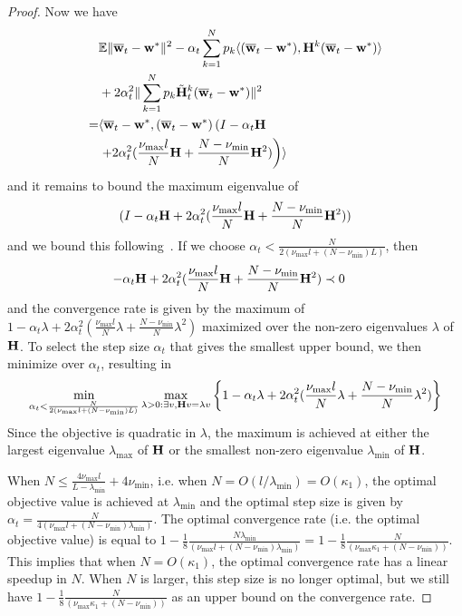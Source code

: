 \begin{proof}
	Now we have 
	\begin{align*}
	& \mathbb{E}\|{\overline{\mathbf{w}}}_{t}-{\mathbf{w}}^{\ast}\|^{2}-\alpha_{t}\sum_{k=1}^{N}p_{k}\langle({\overline{\mathbf{w}}}_{t}-{\mathbf{w}}^{\ast}),{\mathbf{H}}^{k}({\overline{\mathbf{w}}}_{t}-{\mathbf{w}}^{\ast})\rangle\\
	&+2\alpha_{t}^{2}\|\sum_{k=1}^{N}p_{k}\tilde{{\mathbf{H}}}_{t}^{k}({\overline{\mathbf{w}}}_{t}-{\mathbf{w}}^{\ast})\|^{2} \\
	= &\langle{\overline{\mathbf{w}}}_{t}-{\mathbf{w}}^{\ast},({\overline{\mathbf{w}}}_{t}-{\mathbf{w}}^{\ast})\left(I-\alpha_{t}{\mathbf{H}}\right.\\
	&\left.+2\alpha_{t}^{2}(\frac{\nu_{\max}l}{N}{\mathbf{H}}+\frac{N-\nu_{\min}}{N}{\mathbf{H}}^{2})\right)\rangle
	\end{align*}
	and it remains to bound the maximum eigenvalue of 
	\begin{align*}
	(I-\alpha_{t}{\mathbf{H}}+2\alpha_{t}^{2}(\frac{\nu_{\max}l}{N}{\mathbf{H}}+\frac{N-\nu_{\min}}{N}{\mathbf{H}}^{2}))
	\end{align*}
	and we bound this following~\cite{ma2017power}. If we choose $\alpha_{t}<\frac{N}{2(\nu_{\max}l+(N-\nu_{\min})L)}$,
	then 
	\begin{align*}
	-\alpha_{t}{\mathbf{H}}+2\alpha_{t}^{2}(\frac{\nu_{\max}l}{N}{\mathbf{H}}+\frac{N-\nu_{\min}}{N}{\mathbf{H}}^{2}) & \prec0
	\end{align*}
	and the convergence rate is given by the maximum of $1-\alpha_{t}\lambda+2\alpha_{t}^{2}(\frac{\nu_{\max}l}{N}\lambda+\frac{N-\nu_{\min}}{N}\lambda^{2})$
	maximized over the non-zero eigenvalues $\lambda$ of ${\mathbf{H}}$. To select
	the step size $\alpha_{t}$ that gives the smallest upper bound, we
	then minimize over $\alpha_{t}$, resulting in 
	{\tiny
	\begin{align*}
	\min_{\alpha_{t}<\frac{N}{2(\nu_{\max}l+(N-\nu_{\min})L)}}\max_{\lambda>0:\exists v,{\mathbf{H}} v=\lambda v}\left\{ 1-\alpha_{t}\lambda+2\alpha_{t}^{2}(\frac{\nu_{\max}l}{N}\lambda+\frac{N-\nu_{\min}}{N}\lambda^{2})\right\} 
	\end{align*}}%
	Since the objective is quadratic in $\lambda$, the maximum is achieved
	at either the largest eigenvalue $\lambda_{\max}$ of ${\mathbf{H}}$ or the
	smallest non-zero eigenvalue $\lambda_{\min}$ of ${\mathbf{H}}$. 
	
	When $N\leq\frac{4\nu_{\max}l}{L-\lambda_{\min}}+4\nu_{\min}$, i.e.
	when $N=O(l/\lambda_{\min})=O(\kappa_{1})$, the optimal objective
	value is achieved at $\lambda_{\min}$ and the optimal step size is
	given by $\alpha_{t}=\frac{N}{4(\nu_{\max}l+(N-\nu_{\min})\lambda_{\min})}$.
	The optimal convergence rate (i.e. the optimal objective value) is
	equal to $1-\frac{1}{8}\frac{N\lambda_{\min}}{(\nu_{\max}l+(N-\nu_{\min})\lambda_{\min})}=1-\frac{1}{8}\frac{N}{(\nu_{\max}\kappa_{1}+(N-\nu_{\min}))}$.
	This implies that when $N=O(\kappa_{1})$, the optimal convergence
	rate has a linear speedup in $N$. When $N$ is larger, this step
	size is no longer optimal, but we still have $1-\frac{1}{8}\frac{N}{(\nu_{\max}\kappa_{1}+(N-\nu_{\min}))}$
	as an upper bound on the convergence rate. 
	

\end{proof}
